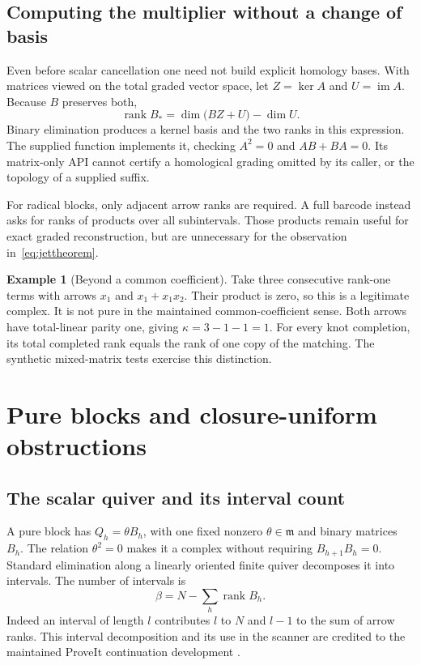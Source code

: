 \documentclass[11pt]{article}
\theoremstyle{definition}\newtheorem{definition}[theorem]{Definition}\newtheorem{example}[theorem]{Example}
\theoremstyle{remark}\newtheorem{remark}[theorem]{Remark}
\newcommand{\rk}{\operatorname{rank}}
\newcommand{\im}{\operatorname{im}}
\newcommand{\rad}{\mathfrak m}
\newcommand{\code}[1]{\texttt{\detokenize{#1}}}
\begin{document}
\subsection{Computing the multiplier without a change of basis}
Even before scalar cancellation one need not build explicit homology bases. With matrices viewed on the total graded vector space, let $Z=\ker A$ and $U=\im A$. Because $B$ preserves both,
\begin{equation}\label{eq:inducedrank}
 \rk B_* = \dim\bigl(BZ+U\bigr)-\dim U.
\end{equation}
Binary elimination produces a kernel basis and the two ranks in this expression. The supplied \code{first_jet_survivors} function implements it, checking $A^2=0$ and $AB+BA=0$. Its matrix-only API cannot certify a homological grading omitted by its caller, or the topology of a supplied suffix.

For radical blocks, only adjacent arrow ranks are required. A full barcode instead asks for ranks of products over all subintervals. Those products remain useful for exact graded reconstruction, but are unnecessary for the observation in~\eqref{eq:jettheorem}.

\begin{example}[Beyond a common coefficient]
Take three consecutive rank-one terms with arrows $x_1$ and $x_1+x_1x_2$. Their product is zero, so this is a legitimate complex. It is not pure in the maintained common-coefficient sense. Both arrows have total-linear parity one, giving $\kappa=3-1-1=1$. For every knot completion, its total completed rank equals the rank of one copy of the matching. The synthetic mixed-matrix tests exercise this distinction.
\end{example}

\section{Pure blocks and closure-uniform obstructions}
\subsection{The scalar quiver and its interval count}
A pure block has $Q_h=\theta B_h$, with one fixed nonzero $\theta\in\rad$ and binary matrices $B_h$. The relation $\theta^2=0$ makes it a complex without requiring $B_{h+1}B_h=0$. Standard elimination along a linearly oriented finite quiver decomposes it into intervals. The number of intervals is
\begin{equation}\label{eq:beta}
 \beta=N-\sum_h\rk B_h.
\end{equation}
Indeed an interval of length $l$ contributes $l$ to $N$ and $l-1$ to the sum of arrow ranks. This interval decomposition and its use in the scanner are credited to the maintained ProveIt continuation development \cite{ProveIt}.
\end{document}
